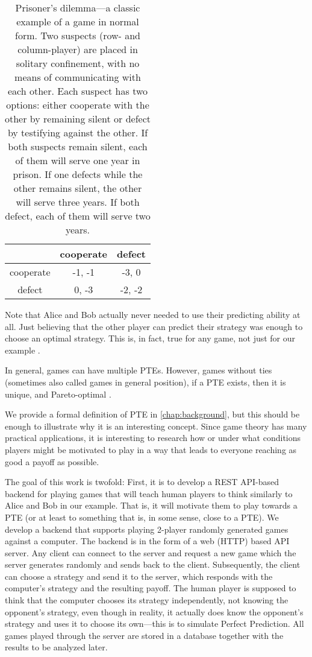 \begin{table}
	\caption{Prisoner's dilemma---a classic example of a game in normal form.
	Two suspects (row- and column-player) are placed in solitary confinement, with no means of communicating with each other.
	Each suspect has two options: either cooperate with the other by remaining silent or defect by testifying against the other.
	If both suspects remain silent, each of them will serve one year in prison.
	If one defects while the other remains silent, the other will serve three years.
	If both defect, each of them will serve two years.
	}
	\label{tab:prisoners-dilemma}
	\centering
	\begin{tabular}{|c|c|c|}
	  \hline
				& cooperate & defect \\
	  \hline
	  cooperate & -1, -1    & -3, 0  \\
	  \hline
	  defect    & 0, -3     & -2, -2 \\
	  \hline
	\end{tabular}
  \end{table}

Note that Alice and Bob actually never needed to use their predicting ability at all.
Just believing that the other player can predict their strategy was enough to choose an optimal strategy.
This is, in fact, true for any game, not just for our example \cite{Fourny20}.

In general, games can have multiple PTEs.
However, games without ties (sometimes also called games in general position), if a PTE exists, then it is unique, and Pareto-optimal \cite{Fourny20}.

We provide a formal definition of PTE in \autoref{chap:background}, but this should be enough to illustrate why it is an interesting concept.
Since game theory has many practical applications, it is interesting to research how or under what conditions players might be motivated to play in a way that leads to everyone reaching as good a payoff as possible.

The goal of this work is twofold:
First, it is to develop a REST API-based backend for playing games that will teach human players to think similarly to Alice and Bob in our example.
That is, it will motivate them to play towards a PTE (or at least to something that is, in some sense, close to a PTE).
We develop a backend that supports playing 2-player randomly generated games against a computer.
The backend is in the form of a web (HTTP) based API server.
Any client can connect to the server and request a new game which the server generates randomly and sends back to the client.
Subsequently, the client can choose a strategy and send it to the server, which responds with the computer's strategy and the resulting payoff.
The human player is supposed to think that the computer chooses its strategy independently, not knowing the opponent's strategy, even though in reality, it actually does know the opponent's strategy and uses it to choose its own---this is to simulate Perfect Prediction.
All games played through the server are stored in a database together with the results to be analyzed later.


